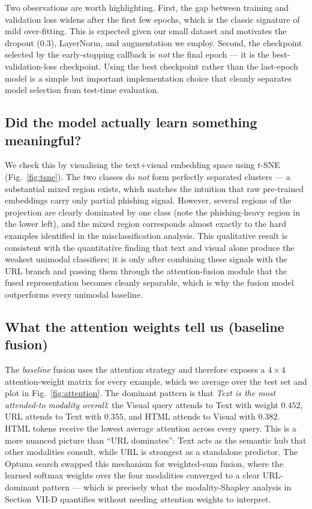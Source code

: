 \documentclass[conference]{IEEEtran}
\begin{document}
Two observations are worth highlighting. First, the gap between
training and validation loss widens after the first few epochs,
which is the classic signature of mild over-fitting. This is
expected given our small dataset and motivates the dropout ($0.3$),
LayerNorm, and augmentation we employ. Second, the checkpoint
selected by the early-stopping callback is \emph{not} the final
epoch --- it is the best-validation-loss checkpoint. Using the best
checkpoint rather than the last-epoch model is a simple but
important implementation choice that cleanly separates model
selection from test-time evaluation.

\subsection{Did the model actually learn something meaningful?}
We check this by visualising the text+visual embedding space using
$t$-SNE (Fig.~\ref{fig:tsne}). The two classes do \emph{not} form
perfectly separated clusters --- a substantial mixed region exists,
which matches the intuition that raw pre-trained embeddings carry
only partial phishing signal. However, several regions of the
projection are clearly dominated by one class (note the
phishing-heavy region in the lower left), and the mixed region
corresponds almost exactly to the hard examples identified in the
misclassification analysis. This qualitative result is consistent
with the quantitative finding that text and visual alone produce
the weakest unimodal classifiers; it is only after combining these
signals with the URL branch and passing them through the
attention-fusion module that the fused representation becomes
cleanly separable, which is why the fusion model outperforms every
unimodal baseline.

\subsection{What the attention weights tell us (baseline fusion)}
The \emph{baseline} fusion uses the attention strategy and therefore
exposes a $4\times 4$ attention-weight matrix for every example,
which we average over the test set and plot in
Fig.~\ref{fig:attention}.  The dominant pattern is that \emph{Text
is the most attended-to modality overall}: the Visual query attends
to Text with weight $0.452$, URL attends to Text with $0.355$, and
HTML attends to Visual with $0.382$.  HTML tokens receive the
lowest average attention across every query.  This is a more
nuanced picture than ``URL dominates'': Text acts as the semantic
hub that other modalities consult, while URL is strongest as a
standalone predictor.  The Optuna search swapped this mechanism for
weighted-sum fusion, where the learned softmax weights over the four
modalities converged to a clear URL-dominant pattern --- which is
precisely what the modality-Shapley analysis in Section~VII-D
quantifies without needing attention weights to interpret.
\end{document}
